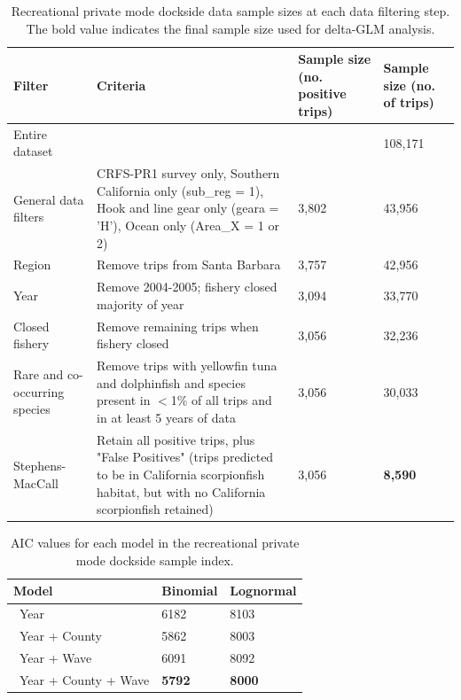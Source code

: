 \documentclass[12pt,]{article}
\begin{document}
\begin{table}[ht]
\centering
\caption{Recreational private mode dockside data sample 
                                          sizes at each data filtering step.  
                                          The bold value indicates the final sample size 
                                          used for delta-GLM analysis.} 
\label{tab:Fleet4_RecPR_dockside_filter}
\begin{tabular}{>{\raggedright}p{1.5in}>{\raggedright}p{2.6in}>{\raggedright}p{1in}>{\raggedright}p{1in}}
  \hline
Filter & Criteria & Sample size (no. positive trips) & Sample size (no. of trips) \\ 
  \hline
Entire dataset &  &  & 108,171 \\ 
  General data filters & CRFS-PR1 survey only, Southern California only (sub\_reg = 1), Hook and line gear only (geara = 'H'), Ocean only (Area\_X = 1 or 2) & 3,802 & 43,956 \\ 
  Region & Remove trips from Santa Barbara & 3,757 & 42,956 \\ 
  Year & Remove 2004-2005; fishery closed majority of year & 3,094 & 33,770 \\ 
  Closed fishery & Remove remaining trips when fishery closed & 3,056 & 32,236 \\ 
  Rare and co-occurring species & Remove trips with yellowfin tuna and dolphinfish and species present in $<$1\% of all trips and in at least 5 years of data & 3,056 & 30,033 \\ 
  Stephens-MacCall & Retain all positive trips, plus "False Positives" (trips predicted to be in California scorpionfish habitat, but with no California scorpionfish retained) & 3,056 & \textbf{8,590} \\ 
   \hline
\end{tabular}
\end{table}\vspace{3in}

\begin{table}[ht]
\centering
\caption{AIC values for each model in the
                                          recreational private mode dockside sample 
                                          index.} 
\label{tab:Fleet4_RecPR_dockside_aic}
\begin{tabular}{lll}
  \hline
Model & Binomial & Lognormal \\ 
  \hline
~Year & 6182 & 8103 \\ 
  ~Year + County & 5862 & 8003 \\ 
  ~Year + Wave & 6091 & 8092 \\ 
  ~Year + County + Wave & \textbf{5792} & \textbf{8000} \\ 
   \hline
\end{tabular}
\end{table}\vspace{3in}
\end{document}
